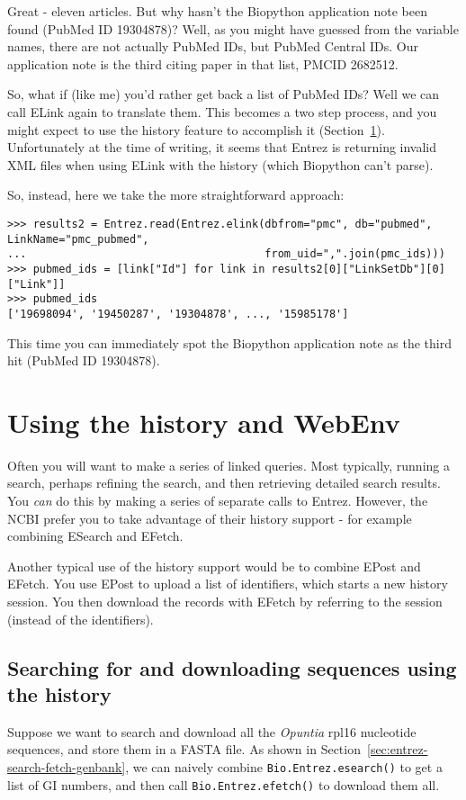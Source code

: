 \documentclass{report}
\begin{document}
Great - eleven articles. But why hasn't the Biopython application note been
found (PubMed ID 19304878)? Well, as you might have guessed from the variable
names, there are not actually PubMed IDs, but PubMed Central IDs. Our
application note is the third citing paper in that list, PMCID 2682512.

So, what if (like me) you'd rather get back a list of PubMed IDs? Well we
can call ELink again to translate them. This becomes a two step process,
and you might expect to use the history feature to accomplish it
(Section~\ref{sec:entrez-webenv}). Unfortunately at the time of writing,
it seems that Entrez is returning invalid XML files when using ELink
with the history (which Biopython can't parse).

So, instead, here we take the more straightforward approach:

\begin{verbatim}
>>> results2 = Entrez.read(Entrez.elink(dbfrom="pmc", db="pubmed", LinkName="pmc_pubmed",
...                                     from_uid=",".join(pmc_ids)))
>>> pubmed_ids = [link["Id"] for link in results2[0]["LinkSetDb"][0]["Link"]]
>>> pubmed_ids
['19698094', '19450287', '19304878', ..., '15985178']
\end{verbatim}

\noindent This time you can immediately spot the Biopython application note
as the third hit (PubMed ID 19304878).

\section{Using the history and WebEnv}
\label{sec:entrez-webenv}

Often you will want to make a series of linked queries.  Most typically,
running a search, perhaps refining the search, and then retrieving detailed
search results.  You \emph{can} do this by making a series of separate calls
to Entrez.  However, the NCBI prefer you to take advantage of their history
support - for example combining ESearch and EFetch.

Another typical use of the history support would be to combine EPost and
EFetch.  You use EPost to upload a list of identifiers, which starts a new
history session.  You then download the records with EFetch by referring
to the session (instead of the identifiers).

\subsection{Searching for and downloading sequences using the history}
Suppose we want to search and download all the \textit{Opuntia} rpl16
nucleotide sequences, and store them in a FASTA file.  As shown in
Section~\ref{sec:entrez-search-fetch-genbank}, we can naively combine
\verb|Bio.Entrez.esearch()| to get a list of GI numbers, and then call
\verb|Bio.Entrez.efetch()| to download them all.
\end{document}
